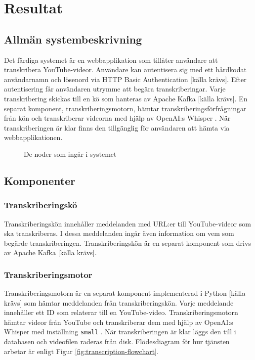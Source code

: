 \chapter{Resultat}
\label{ch:result}

\section{Allmän systembeskrivning}
\label{sec:general-system-description}
Det färdiga systemet är en webbapplikation som tillåter användare att
transkribera YouTube-videor. Användare kan autentisera sig med ett hårdkodat
användarnamn och lösenord via HTTP Basic Authentication [källa krävs]. Efter
autentisering får användaren utrymme att begära transkriberingar. Varje
transkribering skickas till en kö som hanteras av Apache Kafka [källa krävs].
En separat komponent, transkriberingsmotorn, hämtar
transkriberingsförfrågningar från kön och transkriberar videorna med hjälp av
OpenAI:s Whisper \cite{OpenAIWhisper}. När transkriberingen är klar finns den
tillgänglig för användaren att hämta via webbapplikationen.

\begin{figure}[h]
    \centering
    
    \caption{De noder som ingår i systemet}
    \label{fig:system-nodes}
\end{figure}

\section{Komponenter}
\label{sec:components}

\subsection{Transkriberingskö}
\label{sec:transcription-queue}
Transkriberingskön innehåller meddelanden med URL:er till YouTube-videor som
ska transkriberas. I dessa meddelanden ingår även information om vem som
begärde transkriberingen. Transkriberingskön är en separat komponent som drivs
av Apache Kafka [källa krävs].

\subsection{Transkriberingsmotor}
\label{sec:transcription-engine}
Transkriberingsmotorn är en separat komponent implementerad i Python [källa
krävs] som hämtar meddelanden från transkriberingskön. Varje meddelande
innehåller ett ID som relaterar till en YouTube-video. Transkriberingsmotorn
hämtar videor från YouTube och transkriberar dem med hjälp av OpenAI:s Whisper
med inställning \verb|small| \cite{OpenAIWhisper}. När transkriberingen är
klar läggs den till i databasen och videofilen raderas från disk.
Flödesdiagram för hur tjänsten arbetar är enligt Figur
\ref{fig:transcription-flowchart}. 

